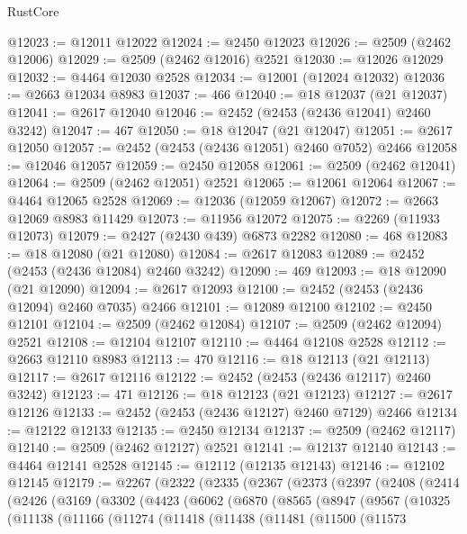 \begin{lexlean}{RustCore}
\begin{coremodule}
@12023 := @12011 @12022
@12024 := @2450 @12023
@12026 := @2509 (@2462 @12006)
@12029 := @2509 (@2462 @12016) @2521
@12030 := @12026 @12029
@12032 := @4464 @12030 @2528
@12034 := @12001 (@12024 @12032)
@12036 := @2663 @12034 @8983
@12037 := 466
@12040 := @18 @12037 (@21 @12037)
@12041 := @2617 @12040
@12046 := @2452 (@2453 (@2436 @12041) @2460 @3242)
@12047 := 467
@12050 := @18 @12047 (@21 @12047)
@12051 := @2617 @12050
@12057 := @2452 (@2453 (@2436 @12051) @2460 @7052) @2466
@12058 := @12046 @12057
@12059 := @2450 @12058
@12061 := @2509 (@2462 @12041)
@12064 := @2509 (@2462 @12051) @2521
@12065 := @12061 @12064
@12067 := @4464 @12065 @2528
@12069 := @12036 (@12059 @12067)
@12072 := @2663 @12069 @8983 @11429
@12073 := @11956 @12072
@12075 := @2269 (@11933 @12073)
@12079 := @2427 (@2430 @439) @6873 @2282
@12080 := 468
@12083 := @18 @12080 (@21 @12080)
@12084 := @2617 @12083
@12089 := @2452 (@2453 (@2436 @12084) @2460 @3242)
@12090 := 469
@12093 := @18 @12090 (@21 @12090)
@12094 := @2617 @12093
@12100 := @2452 (@2453 (@2436 @12094) @2460 @7035) @2466
@12101 := @12089 @12100
@12102 := @2450 @12101
@12104 := @2509 (@2462 @12084)
@12107 := @2509 (@2462 @12094) @2521
@12108 := @12104 @12107
@12110 := @4464 @12108 @2528
@12112 := @2663 @12110 @8983
@12113 := 470
@12116 := @18 @12113 (@21 @12113)
@12117 := @2617 @12116
@12122 := @2452 (@2453 (@2436 @12117) @2460 @3242)
@12123 := 471
@12126 := @18 @12123 (@21 @12123)
@12127 := @2617 @12126
@12133 := @2452 (@2453 (@2436 @12127) @2460 @7129) @2466
@12134 := @12122 @12133
@12135 := @2450 @12134
@12137 := @2509 (@2462 @12117)
@12140 := @2509 (@2462 @12127) @2521
@12141 := @12137 @12140
@12143 := @4464 @12141 @2528
@12145 := @12112 (@12135 @12143)
@12146 := @12102 @12145
@12179 := @2267
    (@2322
      (@2335
        (@2367
          (@2373
            (@2397
              (@2408
                (@2414
                  (@2426
                    (@3169
                      (@3302
                        (@4423
                          (@6062
                            (@6870
                              (@8565
                                (@8947
                                  (@9567
                                    (@10325
                                      (@11138
                                        (@11166
                                          (@11274
                                            (@11418
                                              (@11438
                                                (@11481
                                                  (@11500
                                                    (@11573

\end{coremodule}
\end{lexlean}
